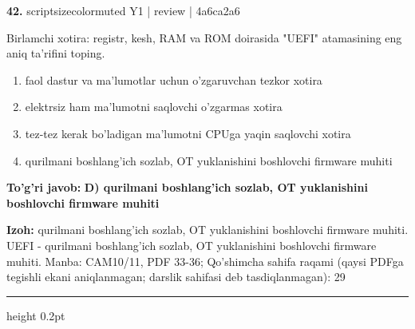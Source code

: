 \documentclass[10pt,a4paper]{article}
\begin{document}
{\bfseries\sffamily\color{ink} 42.} {scriptsizecolor{muted} Y1 | review | 4a6ca2a6}
\par
Birlamchi xotira: registr, kesh, RAM va ROM doirasida "UEFI" atamasining eng aniq ta'rifini toping.
\begin{enumerate}[label=\Alph*),leftmargin=9mm]
\item faol dastur va ma'lumotlar uchun o'zgaruvchan tezkor xotira
\item elektrsiz ham ma'lumotni saqlovchi o'zgarmas xotira
\item tez-tez kerak bo'ladigan ma'lumotni CPUga yaqin saqlovchi xotira
\item qurilmani boshlang'ich sozlab, OT yuklanishini boshlovchi firmware muhiti
\end{enumerate}
\begin{tcolorbox}[enhanced,breakable,colback=teal!4,colframe=teal!60!black,boxrule=0.45pt,arc=1.2mm,left=2.7mm,right=2.7mm,top=1.8mm,bottom=1.8mm,before skip=2mm,after skip=2mm]
{\bfseries\sffamily\color{teal}To'g'ri javob:} \textbf{D) qurilmani boshlang'ich sozlab, OT yuklanishini boshlovchi firmware muhiti}
\par\smallskip
{\bfseries Izoh:} qurilmani boshlang'ich sozlab, OT yuklanishini boshlovchi firmware muhiti. UEFI - qurilmani boshlang'ich sozlab, OT yuklanishini boshlovchi firmware muhiti. Manba: CAM10/11, PDF 33-36; Qo'shimcha sahifa raqami (qaysi PDFga tegishli ekani aniqlanmagan; darslik sahifasi deb tasdiqlanmagan): 29
\end{tcolorbox}
\vspace{2mm}\hrule height 0.2pt\vspace{3mm}
\end{document}
